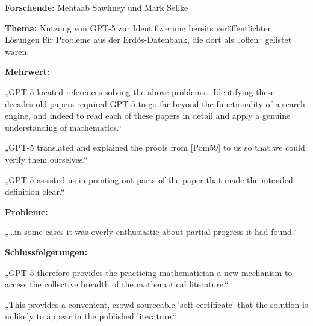 \documentclass[
  ngerman,
  letterpaper,
  DIV=11]{scrreprt}
\begin{document}
\begin{tcolorbox}[enhanced jigsaw, left=2mm, bottomrule=.15mm, arc=.35mm, rightrule=.15mm, colframe=quarto-callout-note-color-frame, coltitle=black, colback=white, toprule=.15mm, toptitle=1mm, colbacktitle=quarto-callout-note-color!10!white, title=\textcolor{quarto-callout-note-color}{\faInfo}\hspace{0.5em}{Mathematik / Literaturrecherche zu Erdős-Problemen}, opacitybacktitle=0.6, leftrule=.75mm, bottomtitle=1mm, titlerule=0mm, opacityback=0, breakable]

\textbf{Forschende:} Mehtaab Sawhney und Mark Sellke

\textbf{Thema:} Nutzung von GPT-5 zur Identifizierung bereits
veröffentlichter Lösungen für Probleme aus der Erdős-Datenbank, die dort
als „offen`` gelistet waren.

\textbf{Mehrwert:}

„GPT-5 located references solving the above problems\ldots{} Identifying
these decades-old papers required GPT-5 to go far beyond the
functionality of a search engine, and indeed to read each of these
papers in detail and apply a genuine understanding of mathematics.``

„GPT-5 translated and explained the proofs from {[}Pom59{]} to us so
that we could verify them ourselves.``

„GPT-5 assisted us in pointing out parts of the paper that made the
intended definition clear.``

\textbf{Probleme:}

„\ldots in some cases it was overly enthusiastic about partial progress
it had found.``

\textbf{Schlussfolgerungen:}

„GPT-5 therefore provides the practicing mathematician a new mechanism
to access the collective breadth of the mathematical literature.``

„This provides a convenient, crowd-sourceable `soft certificate' that
the solution is unlikely to appear in the published literature.``

\end{tcolorbox}
\end{document}
